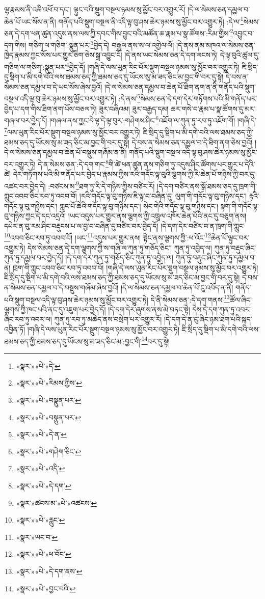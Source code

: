 ལྷ་རྣམས་ནི་འཆི་འཕོ་བ་དང་། ལྟུང་བའི་སྡུག་བསྔལ་ཉམས་སུ་མྱོང་བར་འགྱུར་རོ། །དེ་ལ་སེམས་ཅན་དམྱལ་བ་ཆེན་པོ་ཡང་སོས་ན་ནི། གནོད་པའི་སྡུག་བསྔལ་ནི་འདི་ལྟ་བུ་ཤས་ཆེར་ཉམས་སུ་མྱོང་བར་འགྱུར་ཏེ། :དེ་ལ་\footnote{«སྣར་»«པེ་»དེ་}སེམས་ཅན་དེ་དག་ཕན་ཚུན་འདུས་ནས་ལས་ཀྱི་དབང་གིས་བྱུང་བའི་མཚོན་ཆ་རྣམ་པ་སྣ་ཚོགས་:རིམ་གྱིས་\footnote{«སྣར་»«པེ་»རིམས་ཀྱིས་}འབྱུང་བ་དག་གིས། གཅིག་ལ་གཅིག་:སྣུན་པར་\footnote{«སྣར་»«པེ་»བསྣུན་པར་}བྱེད་དེ། བརྒྱལ་ནས་ས་ལ་འགྱེལ་ལོ། །དེ་ནས་ནམ་མཁའ་ལ་སེམས་ཅན་ཁྱེད་རྣམས་ཀྱང་སོས་པར་གྱུར་ཅིག་ཅེས་སྒྲ་འབྱུང་ངོ། །དེ་ནས་ཡང་སེམས་ཅན་དེ་དག་ལངས་ཏེ། དེ་ལྟ་བུའི་ཚུལ་དུ་གཅིག་ལ་གཅིག་:སྣུན་པར་\footnote{«སྣར་»«པེ་»བསྣུན་པར་}བྱེད་དོ། །གཞི་དེ་ལས་ཡུན་རིང་པོར་སྡུག་བསྔལ་ཉམས་སུ་མྱོང་བར་འགྱུར་ཏེ། ཇི་སྲིད་དུ་སྡིག་པ་མི་དགེ་བའི་ལས་ཐམས་ཅད་ཀྱི་ཐམས་ཅད་དུ་ཡོངས་སུ་མ་ཟད་ཅིང་མ་བྱང་གི་བར་དུ་སྟེ། དེ་བས་ན་སེམས་ཅན་དམྱལ་བ་དེ་ཡང་སོས་ཞེས་བྱའོ། །དེ་ལ་སེམས་ཅན་དམྱལ་བ་ཆེན་པོ་ཐིག་ནག་ན་ནི་གནོད་པའི་སྡུག་བསྔལ་འདི་ལྟ་བུ་ཆེར་ཉམས་སུ་མྱོང་བར་འགྱུར་ཏེ། :དེ་ནས་\footnote{«སྣར་»«པེ་»དེ་ན་}སེམས་ཅན་དེ་དག་དེར་གཏོགས་པའི་མི་གནོད་པར་བྱེད་པ་དག་གིས་ཐིག་ནག་པོས་བཅལ་ཏེ། ཟུར་བཞིའམ། ཟུར་བརྒྱད་དམ། ཆར་གསེ་བ་རྣམ་པ་སྣ་ཚོགས་དུ་མར་གཞལ་བར་བྱེད་དོ། །གཞལ་ནས་ཀྱང་དེ་ལྟ་དེ་ལྟ་བུར་:གཤེགས་ཤིང་\footnote{«སྣར་»«པེ་»གཤེག་ཅིང་}འཇོག་ལ་ཀུན་ཏུ་རབ་ཏུ་འཇོག་གོ། །གཞི་དེ་\footnote{«སྣར་»«པེ་»འདི་}ལས་ཡུན་རིང་པོར་སྡུག་བསྔལ་ཉམས་སུ་མྱོང་བར་འགྱུར་ཏེ། ཇི་སྲིད་དུ་སྡིག་པ་མི་དགེ་བའི་ལས་ཐམས་ཅད་ཀྱི་ཐམས་ཅད་དུ་ཡོངས་སུ་མ་ཟད་ཅིང་མ་བྱང་གི་བར་དུ་སྟེ། དེ་བས་ན་སེམས་ཅན་དམྱལ་བ་དེ་ཐིག་ནག་ཅེས་བྱའོ། །དེ་ལ་སེམས་ཅན་དམྱལ་བ་ཆེན་པོ་བསྡུས་གཞོམ་ན་ནི། གནོད་པའི་སྡུག་བསྔལ་འདི་ལྟ་བུ་ཤས་ཆེར་ཉམས་སུ་མྱོང་བར་འགྱུར་ཏེ། དེ་ན་སེམས་ཅན་:དེ་དག་གང་\footnote{«སྣར་»«པེ་»དེ་དག་}གི་ཚེ་ཕན་ཚུན་ནས་གཅིག་ཏུ་འདུས་ཤིང་ཚོགས་པར་གྱུར་པ་དེའི་ཚེ། དེར་གཏོགས་པའི་མི་གནོད་པར་བྱེད་པ་རྣམས་ཀྱིས་རའི་གདོང་ལྟ་བུའི་ལྕགས་ཀྱི་རི་ཆེན་པོ་གཉིས་ཀྱི་བར་དུ་འཚང་བར་བྱེད་དེ། :བཙངས་མ་\footnote{«སྣར་»ཚངས་མ་«པེ་»འཚངས་}ཐག་ཏུ་རི་དེ་གཉིས་ཀྱིས་བཙིར་རོ། །དེ་དག་བཙིར་ནས་སྒོ་ཐམས་ཅད་དུ་ཁྲག་གི་ཀླུང་འབབ་ཅིང་རབ་ཏུ་འབབ་བོ། །རའི་གདོང་ལྟ་བུ་གཉིས་ཇི་ལྟ་བ་བཞིན་དུ། ལུག་གི་གདོང་ལྟ་བུ་གཉིས་དང་། རྟའི་གདོང་ལྟ་བུ་གཉིས་དང་། གླང་པོ་ཆེའི་གདོང་ལྟ་བུ་གཉིས་དང་། སེང་གེའི་གདོང་ལྟ་བུ་གཉིས་དང་། སྟག་གི་གདོང་ལྟ་བུ་གཉིས་ཀྱང་དེ་དང་འདྲའོ། །ཡང་འདུས་པར་གྱུར་ནས་ལྕགས་ཀྱི་འཁྲུལ་འཁོར་ཆེན་པོའི་ནང་དུ་བཅུག་ནས། དཔེར་ན་བུ་རམ་ཤིང་བརྡུངས་པ་ལ་བྱ་བ་བཞིན་དུ་བཙིར་བར་བྱེད་དོ། །དེ་དག་དེར་བཙིར་བ་ན་ཁྲག་གི་ཀླུང་\footnote{«སྣར་»«པེ་»རླུང་}འབབ་ཅིང་རབ་ཏུ་འབབ་བོ། །ཡང་\footnote{«སྣར་»ཡང་བ་}འདུས་པར་གྱུར་ནས། སྟེང་ནས་ལྕགས་ཀྱི་:ཕ་འོང་\footnote{«སྣར་»«པེ་»ཕ་བོང་}ཆེན་པོ་ལྟུང་བར་འགྱུར་ཏེ། དེས་སེམས་ཅན་དེ་དག་ལྕགས་ཀྱི་ས་གཞི་ལ་ཀུན་ཏུ་གཅོད་ཅིང་། ཀུན་ཏུ་འབྱེད་ལ། ཀུན་ཏུ་བརྡུང་ཞིང་ཀུན་ཏུ་དམྱལ་བར་བྱེད་དོ། །དེ་དག་དེར་ཀུན་ཏུ་གཅོད་ཅིང་ཀུན་ཏུ་འབྱེད་ལ། ཀུན་ཏུ་བརྡུང་ཞིང་ཀུན་ཏུ་དམྱལ་བ་ན། ཁྲག་གི་ཀླུང་འབབ་ཅིང་རབ་ཏུ་འབབ་བོ། །གཞི་དེ་ལས་ཡུན་རིང་པོར་སྡུག་བསྔལ་ཉམས་སུ་མྱོང་བར་འགྱུར་ཏེ། ཇི་སྲིད་དུ་སྡིག་པ་མི་དགེ་བའི་ལས་ཐམས་ཅད་ཀྱི་ཐམས་ཅད་དུ་ཡོངས་སུ་མ་ཟད་ཅིང་མ་བྱང་གི་བར་དུ་སྟེ། དེ་བས་ན་སེམས་ཅན་དམྱལ་བ་དེ་བསྡུས་གཞོམ་ཞེས་བྱའོ། །དེ་ལ་སེམས་ཅན་དམྱལ་བ་ཆེན་པོ་ངུ་འབོད་ན་ནི། གནོད་པའི་སྡུག་བསྔལ་འདི་ལྟ་བུ་ཤས་ཆེར་ཉམས་སུ་མྱོང་བར་འགྱུར་ཏེ། དེ་ནི་སེམས་ཅན་:དེ་དག་གནས་\footnote{«སྣར་»«པེ་»དེ་དག་ནས་}ཚོལ་ཞིང་ལྕགས་ཀྱི་ཁང་པའི་ནང་དུ་འཇུག་པར་བྱེད་དོ། །དེ་དག་དེར་ཞུགས་ནས་མེ་བཏང་སྟེ། དེས་དེ་དག་ཀུན་ཏུ་འབར་ཞིང་རབ་ཏུ་འབར་ལ། ཀུན་ཏུ་རབ་ཏུ་མཆེད་ནས་བསྲེག་པར་འགྱུར་རོ། །དེ་དག་དེ་ན་ངུ་ཞིང་ཉམ་ཐག་པའི་སྐད་འབྱིན་ཏོ། །གཞི་དེ་ལས་ཡུན་རིང་པོར་སྡུག་བསྔལ་ཉམས་སུ་མྱོང་བར་འགྱུར་ཏེ། ཇི་སྲིད་དུ་སྡིག་པ་མི་དགེ་བའི་ལས་ཐམས་ཅད་ཀྱི་ཐམས་ཅད་དུ་ཡོངས་སུ་མ་ཟད་ཅིང་མ་:བྱང་གི་\footnote{«སྣར་»«པེ་»བྱང་བའི་}བར་དུ་སྟེ། 